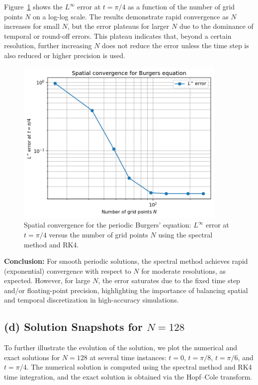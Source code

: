 \documentclass{article}
\begin{document}
Figure~\ref{fig:burgers_N_convergence} shows the $L^\infty$ error at $t = \pi/4$ as a function of the number of grid points $N$ on a log-log scale. The results demonstrate rapid convergence as $N$ increases for small $N$, but the error plateaus for larger $N$ due to the dominance of temporal or round-off errors. This plateau indicates that, beyond a certain resolution, further increasing $N$ does not reduce the error unless the time step is also reduced or higher precision is used.

\begin{figure}[htbp]
    \centering
    \includegraphics[width=0.9\textwidth]{figure/burgers_N_convergence.png}
    \caption{Spatial convergence for the periodic Burgers' equation: $L^\infty$ error at $t=\pi/4$ versus the number of grid points $N$ using the spectral method and RK4.}
    \label{fig:burgers_N_convergence}
\end{figure}

\textbf{Conclusion:} For smooth periodic solutions, the spectral method achieves rapid (exponential) convergence with respect to $N$ for moderate resolutions, as expected. However, for large $N$, the error saturates due to the fixed time step and/or floating-point precision, highlighting the importance of balancing spatial and temporal discretization in high-accuracy simulations.

\subsection*{(d) Solution Snapshots for $N=128$}
To further illustrate the evolution of the solution, we plot the numerical and exact solutions for $N=128$ at several time instances: $t=0$, $t=\pi/8$, $t=\pi/6$, and $t=\pi/4$. The numerical solution is computed using the spectral method and RK4 time integration, and the exact solution is obtained via the Hopf--Cole transform.
\end{document}
